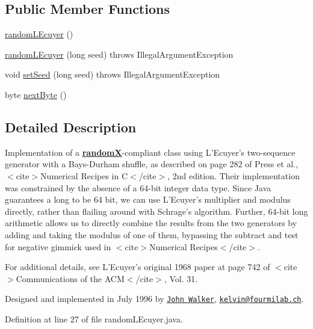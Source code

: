 \subsection*{Public Member Functions}
\begin{DoxyCompactItemize}
\item 
\hyperlink{classorg_1_1jgap_1_1util_1_1random_l_ecuyer_acc7d2d5b8cde7de0a580b1d9ded91799}{random\-L\-Ecuyer} ()
\item 
\hyperlink{classorg_1_1jgap_1_1util_1_1random_l_ecuyer_a51d64e7303a6f6c7eb7a880de3be7af0}{random\-L\-Ecuyer} (long seed)  throws Illegal\-Argument\-Exception 
\item 
void \hyperlink{classorg_1_1jgap_1_1util_1_1random_l_ecuyer_a951ef034c3579306fadfaf7785e6b1c8}{set\-Seed} (long seed)  throws Illegal\-Argument\-Exception 
\item 
byte \hyperlink{classorg_1_1jgap_1_1util_1_1random_l_ecuyer_aea42f1e0206083a4b8943bd3ec50972d}{next\-Byte} ()
\end{DoxyCompactItemize}


\subsection{Detailed Description}
Implementation of a {\bfseries \hyperlink{classorg_1_1jgap_1_1util_1_1random_x}{random\-X}}-\/compliant class using L'Ecuyer's two-\/sequence generator with a Bays-\/\-Durham shuffle, as described on page 282 of Press et al., $<$cite$>$Numerical Recipes in C$<$/cite$>$, 2nd edition. Their implementation was constrained by the absence of a 64-\/bit integer data type. Since Java guarantees a {\ttfamily long} to be 64 bit, we can use L'Ecuyer's multiplier and modulus directly, rather than flailing around with Schrage's algorithm. Further, 64-\/bit {\ttfamily long} arithmetic allows us to directly combine the results from the two generators by adding and taking the modulus of one of them, bypassing the subtract and test for negative gimmick used in $<$cite$>$Numerical Recipes$<$/cite$>$.

For additional details, see L'Ecuyer's original 1968 paper at page 742 of $<$cite$>$Communications of the A\-C\-M$<$/cite$>$, Vol. 31.

Designed and implemented in July 1996 by \href{http://www.fourmilab.ch/}{\tt John Walker}, \href{mailto:kelvin@fourmilab.ch}{\tt kelvin@fourmilab.\-ch}. 

Definition at line 27 of file random\-L\-Ecuyer.\-java.



